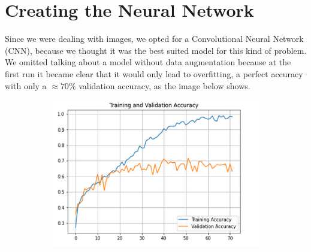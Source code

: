 \documentclass[a4paper,12pt]{article}
\numberwithin{equation}{section}
\begin{document}
\section*{Creating the Neural Network}
Since we were dealing with images, we opted for a Convolutional Neural Network (CNN), because we thought it was the best suited model for this kind of problem. We omitted talking about a model without data augmentation because at the first run it became clear that it would only lead to overfitting, a perfect accuracy with only a \(\approx 70\%\) validation accuracy, as the image below shows. 
\begin{figure}[h]
      \begin{subfigure}{0.5\textwidth}

      \includegraphics[scale=0.5]{model_noaug_acc.png}  
      \end{subfigure}
      \begin{subfigure}{0.4\textwidth}

\end{subfigure}
\end{figure}
\end{document}
